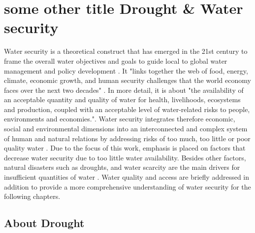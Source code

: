 {\section{some other title Drought \& Water security} %

Water security is a theoretical construct that has emerged in the 21st century to frame the overall water objectives and goals to guide local to global water management and policy development \autocite{sadoffWaterSecurity2020a}. It "links together the web of food, energy, climate, economic growth, and human security challenges that the world economy faces over the next two decades" \autocite[5]{wefBubbleCloseBursting2009}. In more detail, it is about "the availability of an acceptable quantity and quality of water for health, livelihoods, ecosystems and production, coupled with an acceptable level of water-related risks to people, environments and economies."\autocite{greySinkSwimWater2007}.
Water security integrates therefore economic, social and environmental dimensions into an interconnected and complex system of human and natural relations by addressing risks of too much, too little or poor quality water \autocite{vanbeekWaterSecurityPutting2014, mishraWaterSecurityChanging2021}. Due to the focus of this work, emphasis is placed on factors that decrease water security due to too little water availability. Besides other factors, natural disasters such as droughts, and water scarcity are the main drivers for insufficient quantities of water \autocite{caretta2022water}. Water quality and access are briefly addressed in addition to provide a more comprehensive  understanding of water security for the following chapters.




\subsection{About Drought}\label{subsec:about_drought}

}
